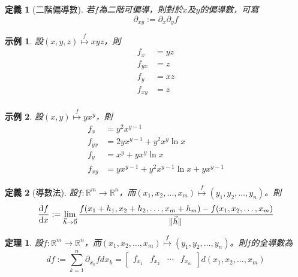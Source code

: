 \documentclass[12pt]{article}
\newtheorem{definition}{定義}
\newtheorem*{theorem}{定理}
\newtheorem*{example}{示例}
\begin{document}
    \begin{definition}[二階偏導數]
        若$f$為二階可偏導，則對於$x$及$y$的偏導數，可寫$$\partial_{xy}:=\partial_x \partial_y f$$
    \end{definition}

    \begin{example}
        設$(x,y,z) \overset{f}{\mapsto}xyz$，則\begin{align*}
            f_x&=yz\\
            f_{yx}&=z\\
            f_y&=xz\\
            f_{xy}&=z\\
        \end{align*}
    \end{example}

    \begin{example}
        設$(x,y) \overset{f}{\mapsto}yx^y$，則\begin{align*}
            f_x&=y^2x^{y-1}\\
            f_{yx}&=2yx^{y-1}+y^2x^y\ln{x}\\
            f_y&=x^y+yx^y\ln{x}\\
            f_{xy}&=yx^{y-1}+y^2x^{y-1}\ln{x}+yx^{y-1}
        \end{align*}
    \end{example}

    \begin{definition}[導數法]
        設$f:\mathbb{R}^m\to\mathbb{R}^n$，而$(x_1,x_2,\dots,x_m)\overset{f}{\mapsto}(y_1,y_2,\dots,y_n)$。則\begin{align*}
            \derivative{f}{x}:=\lim_{\vec{h}\to\vec{0}}\frac{f(x_1+h_1,x_2+h_2,\dots,x_m+h_m)-f(x_1,x_2,\dots,x_m)}{\norm*{\vec{h}}}
        \end{align*}
    \end{definition}

    \begin{theorem}
        設$f:\mathbb{R}^m\to\mathbb{R}^n$，而$(x_1,x_2,\dots,x_m)\overset{f}{\mapsto}(y_1,y_2,\dots,y_n)$。則$f$的全導數為$$df:=\sum_{k=1}^{n}\partial_{x_k}f dx_k=\begin{bmatrix}
            f_{x_1}&f_{x_2}&\cdots&f_{x_m}
        \end{bmatrix}d(x_1,x_2,\dots,x_m)$$
    \end{theorem}
\end{document}
